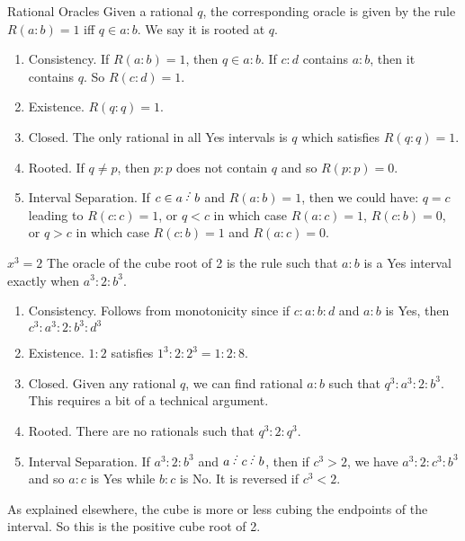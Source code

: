 \documentclass{beamer}
\begin{document}
\begin{frame}{Rational Oracles}
    Given a rational $q$, the corresponding oracle is given by the rule $R(a:b) = 1$ iff $q \in a:b$. We say it is rooted at $q$.

    \begin{enumerate}
    \item Consistency. If $R(a:b) = 1$, then $q \in a:b$. If $c:d$ contains $a:b$, then it contains $q$. So $R(c:d) = 1$.
    \pause
    \item Existence. $R(q:q) = 1$. 
    \pause
    \item Closed. The only rational in all Yes intervals is $q$ which satisfies $R(q:q) = 1$. 
    \pause
    \item Rooted. If $q \neq p$, then $p:p$ does not contain $q$ and so $R(p:p) = 0$.
    \pause
    \item Interval Separation. If $c \in a \lte b$ and $R(a:b) = 1$, then we could have: $q = c$ leading to $R(c:c) = 1$, or $ q< c$ in which case $R(a:c) = 1$, $R(c:b) = 0$, or $q > c$ in which case $R(c:b) = 1$ and $R(a:c)=0$. 
    \end{enumerate}
    
\end{frame}


\begin{frame}{\texorpdfstring{$x^3 = 2$}{xcubeeq2}}
    The oracle of the cube root of 2 is the rule such that $a:b$ is a Yes interval exactly when $a^3 : 2 : b^3$.

    \begin{enumerate}
    \item Consistency. Follows from monotonicity since if $c:a:b:d$ and $a:b$ is Yes, then  $c^3 : a^3 : 2 : b^3 : d^3$
    \pause
    \item Existence. $1:2$ satisfies $1^3 : 2 : 2^3 = 1:2:8$. 
    \pause
    \item Closed. Given any rational $q$, we can find rational $a:b$ such that $q^3 : a^3 : 2 :b^3$. This requires a bit of a technical argument.
    \pause
    \item Rooted. There are no rationals such that $q^3 : 2 : q^3$.
    \pause
    \item Interval Separation. If $a^3 : 2 : b^3$ and $a\lte c \lte b$, then if $c^3 > 2$, we have $a^3 : 2 : c^3 :b^3$ and so $a:c$ is Yes while $b:c$ is No. It is reversed if $c^3 < 2$. 
    \end{enumerate}

    As explained elsewhere, the cube is more or less cubing the endpoints of the interval. So this is the positive cube root of 2. 
    
\end{frame}
\end{document}
